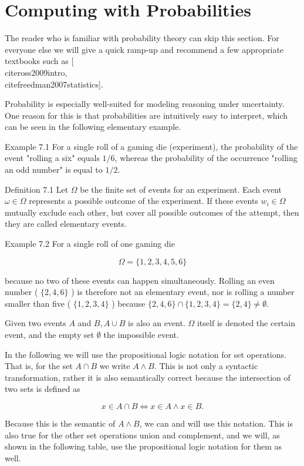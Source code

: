 \documentclass[10pt]{book}
\begin{document}
\section{Computing with Probabilities}
The reader who is familiar with probability theory can skip this section. For everyone else we will give a quick ramp-up and recommend a few appropriate textbooks such as [\\cite{ross2009intro}, \\cite{freedman2007statistics}].

Probability is especially well-suited for modeling reasoning under uncertainty. One reason for this is that probabilities are intuitively easy to interpret, which can be seen in the following elementary example.

Example 7.1 For a single roll of a gaming die (experiment), the probability of the event "rolling a six" equals $1 / 6$, whereas the probability of the occurrence "rolling an odd number" is equal to $1 / 2$.

Definition 7.1 Let $\Omega$ be the finite set of events for an experiment. Each event $\omega \in \Omega$ represents a possible outcome of the experiment. If these events $w_{i} \in \Omega$ mutually exclude each other, but cover all possible outcomes of the attempt, then they are called elementary events.

Example 7.2 For a single roll of one gaming die


$$
\Omega=\{1,2,3,4,5,6\}
$$

because no two of these events can happen simultaneously. Rolling an even number ( $\{2,4,6\}$ ) is therefore not an elementary event, nor is rolling a number smaller than five ( $\{1,2,3,4\}$ ) because $\{2,4,6\} \cap\{1,2,3,4\}=\{2,4\} \neq \emptyset$.

Given two events $A$ and $B, A \cup B$ is also an event. $\Omega$ itself is denoted the certain event, and the empty set $\emptyset$ the impossible event.

In the following we will use the propositional logic notation for set operations. That is, for the set $A \cap B$ we write $A \wedge B$. This is not only a syntactic transformation, rather it is also semantically correct because the intersection of two sets is defined as

$$
x \in A \cap B \Leftrightarrow x \in A \wedge x \in B .
$$

Because this is the semantic of $A \wedge B$, we can and will use this notation. This is also true for the other set operations union and complement, and we will, as shown in the following table, use the propositional logic notation for them as well.
\end{document}
